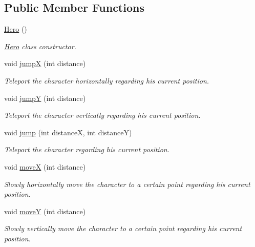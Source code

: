 \subsection*{Public Member Functions}
\begin{DoxyCompactItemize}
\item 
\hyperlink{classworld_1_1character_1_1_hero_aa2013a38abaa16be012e161dc50283f4}{Hero} ()
\begin{DoxyCompactList}\small\item\em \hyperlink{classworld_1_1character_1_1_hero}{Hero} class constructor. \end{DoxyCompactList}\item 
void \hyperlink{classworld_1_1character_1_1_character_a1c4f59dee601acfb4cf3ec000a87e142}{jump\-X} (int distance)
\begin{DoxyCompactList}\small\item\em Teleport the character horizontally regarding his current position. \end{DoxyCompactList}\item 
void \hyperlink{classworld_1_1character_1_1_character_aaddaea7c1175b19f80c0a10b87b59d75}{jump\-Y} (int distance)
\begin{DoxyCompactList}\small\item\em Teleport the character vertically regarding his current position. \end{DoxyCompactList}\item 
void \hyperlink{classworld_1_1character_1_1_character_a38da898f19b8ac87049552edb20a70c8}{jump} (int distance\-X, int distance\-Y)
\begin{DoxyCompactList}\small\item\em Teleport the character regarding his current position. \end{DoxyCompactList}\item 
void \hyperlink{classworld_1_1character_1_1_character_afd88136a2b4b1ece60657bb4481ab955}{move\-X} (int distance)
\begin{DoxyCompactList}\small\item\em Slowly horizontally move the character to a certain point regarding his current position. \end{DoxyCompactList}\item 
void \hyperlink{classworld_1_1character_1_1_character_af0dd57e9b3d6a43fec1292f5333f0208}{move\-Y} (int distance)
\begin{DoxyCompactList}\small\item\em Slowly vertically move the character to a certain point regarding his current position. \end{DoxyCompactList}\item 

\end{DoxyCompactItemize}
